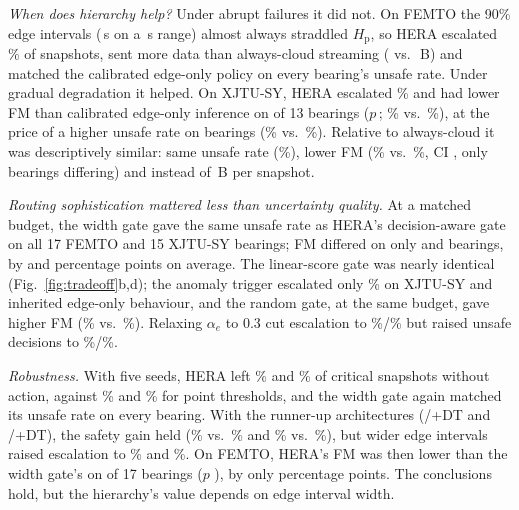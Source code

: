 \documentclass[conference]{IEEEtran}
\newcommand{\Hp}{H_{\mathrm{p}}}
\begin{document}
\textit{When does hierarchy help?} Under abrupt failures it did not. On FEMTO the 90\% edge intervals (\feMpiwEdge\,s on a \feRmax\,s range) almost always straddled $\Hp$, so HERA escalated \feEscHera\% of snapshots, sent more data than always-cloud streaming (\feBytesHera{} vs.\ \feBytesCloud\,B) and matched the calibrated edge-only policy on every bearing's unsafe rate. Under gradual degradation it helped. On XJTU-SY, HERA escalated \xjEscHera\% and had lower FM than calibrated edge-only inference on \xjNzFmHeraEdge{} of 13 bearings ($p$\,\xjPFmHeraEdge; \xjFmHera\% vs.\ \xjFmEdge\%), at the price of a higher unsafe rate on \xjNzHeraEdge{} bearings (\xjUnsafeHera\% vs.\ \xjUnsafeEdge\%). Relative to always-cloud it was descriptively similar: same unsafe rate (\xjUnsafeHera\%), lower FM (\xjFmHera\% vs.\ \xjFmCloud\%, CI \xjCiFmCl, only \xjNzFmHeraCloud{} bearings differing) and \xjBytesHera{} instead of \xjBytesCloud\,B per snapshot.

\textit{Routing sophistication mattered less than uncertainty quality.} At a matched budget, the width gate gave the same unsafe rate as HERA's decision-aware gate on all 17 FEMTO and 15 XJTU-SY bearings; FM differed on only \feRobNzFmWidth{} and \xjRobNzFmWidth{} bearings, by \feRobFmWidthDiff{} and \xjRobFmWidthDiff{} percentage points on average. The linear-score gate was nearly identical (Fig.~\ref{fig:tradeoff}b,d); the anomaly trigger escalated only \xjEscHeraFixed\% on XJTU-SY and inherited edge-only behaviour, and the random gate, at the same budget, gave higher FM (\xjFmRandom\% vs.\ \xjFmHera\%). Relaxing $\alpha_e$ to 0.3 cut escalation to \feEscAlphaThirty\%/\xjEscAlphaThirty\% but raised unsafe decisions to \feUnsafeAlphaThirty\%/\xjUnsafeAlphaThirty\%.

\textit{Robustness.} With five seeds, HERA left \feRobFiveUnsafeHera\% and \xjRobFiveUnsafeHera\% of critical snapshots without action, against \feRobFiveUnsafePoint\% and \xjRobFiveUnsafePoint\% for point thresholds, and the width gate again matched its unsafe rate on every bearing. With the runner-up architectures (\feRobAltEdge/\feRobAltCloud+DT and \xjRobAltEdge/\xjRobAltCloud+DT), the safety gain held (\feRobAltUnsafeHera\% vs.\ \feRobAltUnsafePoint\% and \xjRobAltUnsafeHera\% vs.\ \xjRobAltUnsafePoint\%), but wider edge intervals raised escalation to \feRobAltEscHera\% and \xjRobAltEscHera\%. On FEMTO, HERA's FM was then lower than the width gate's on \feRobAltNzFmWidth{} of 17 bearings ($p$ \feRobAltPFmWidth), by only \feRobAltFmWidthDiff{} percentage points. The conclusions hold, but the hierarchy's value depends on edge interval width.
\end{document}
